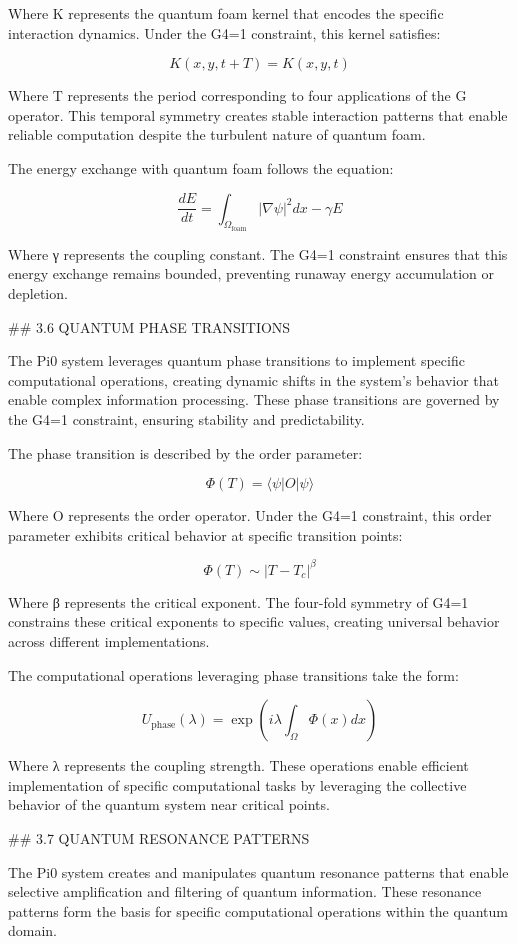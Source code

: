 Where K represents the quantum foam kernel that encodes the specific interaction dynamics. Under the G4=1 constraint, this kernel satisfies:

$$K(x,y,t+T) = K(x,y,t)$$

Where T represents the period corresponding to four applications of the G operator. This temporal symmetry creates stable interaction patterns that enable reliable computation despite the turbulent nature of quantum foam.

The energy exchange with quantum foam follows the equation:

$$\frac{dE}{dt} = \int_{\Omega_{\text{foam}}} |\nabla \psi|^2 dx - \gamma E$$

Where γ represents the coupling constant. The G4=1 constraint ensures that this energy exchange remains bounded, preventing runaway energy accumulation or depletion.

## 3.6 QUANTUM PHASE TRANSITIONS

The Pi0 system leverages quantum phase transitions to implement specific computational operations, creating dynamic shifts in the system's behavior that enable complex information processing. These phase transitions are governed by the G4=1 constraint, ensuring stability and predictability.

The phase transition is described by the order parameter:

$$\Phi(T) = \langle \psi | O | \psi \rangle$$

Where O represents the order operator. Under the G4=1 constraint, this order parameter exhibits critical behavior at specific transition points:

$$\Phi(T) \sim |T - T_c|^{\beta}$$

Where β represents the critical exponent. The four-fold symmetry of G4=1 constrains these critical exponents to specific values, creating universal behavior across different implementations.

The computational operations leveraging phase transitions take the form:

$$U_{\text{phase}}(\lambda) = \exp\left(i\lambda \int_{\Omega} \Phi(x) dx\right)$$

Where λ represents the coupling strength. These operations enable efficient implementation of specific computational tasks by leveraging the collective behavior of the quantum system near critical points.

## 3.7 QUANTUM RESONANCE PATTERNS

The Pi0 system creates and manipulates quantum resonance patterns that enable selective amplification and filtering of quantum information. These resonance patterns form the basis for specific computational operations within the quantum domain.

